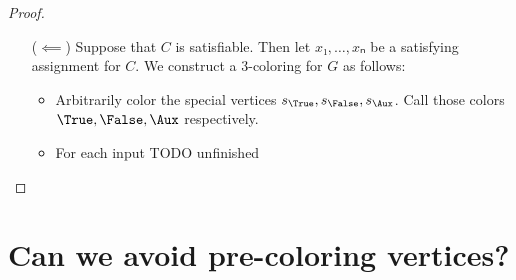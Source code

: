 \begin{proof}
\begin{itemize}
    \item[(\(⟸\))] Suppose that \(C\) is satisfiable.  Then let
      \(x₁,\dotsc,xₙ\) be a satisfying assignment for \(C\).  We construct a
      3-coloring for \(G\) as follows:
      \begin{itemize}
        \item Arbitrarily color the special vertices
          \(s_\True,s_\False,s_\Aux\).  Call those colors \(\True,\False,\Aux\)
          respectively.
        \item For each input TODO unfinished
      \end{itemize}


  \end{itemize}


\end{proof}

\section{Can we avoid pre-coloring vertices?}



%
%
%
%
